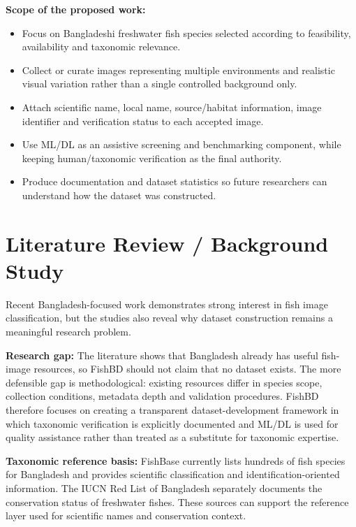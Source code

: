 \documentclass[12pt,a4paper]{article}
\begin{document}
\textbf{Scope of the proposed work:}
\begin{itemize}
    \item Focus on Bangladeshi freshwater fish species selected according to feasibility, availability and taxonomic relevance.
    \item Collect or curate images representing multiple environments and realistic visual variation rather than a single controlled background only.
    \item Attach scientific name, local name, source/habitat information, image identifier and verification status to each accepted image.
    \item Use ML/DL as an assistive screening and benchmarking component, while keeping human/taxonomic verification as the final authority.
    \item Produce documentation and dataset statistics so future researchers can understand how the dataset was constructed.
\end{itemize}

\section{Literature Review / Background Study}

Recent Bangladesh-focused work demonstrates strong interest in fish image classification, but the studies also reveal why dataset construction remains a meaningful research problem.

\textbf{Research gap:} The literature shows that Bangladesh already has useful fish-image resources, so FishBD should not claim that no dataset exists. The more defensible gap is methodological: existing resources differ in species scope, collection conditions, metadata depth and validation procedures. FishBD therefore focuses on creating a transparent dataset-development framework in which taxonomic verification is explicitly documented and ML/DL is used for quality assistance rather than treated as a substitute for taxonomic expertise.

\textbf{Taxonomic reference basis:} FishBase currently lists hundreds of fish species for Bangladesh and provides scientific classification and identification-oriented information. The IUCN Red List of Bangladesh separately documents the conservation status of freshwater fishes. These sources can support the reference layer used for scientific names and conservation context.
\end{document}

